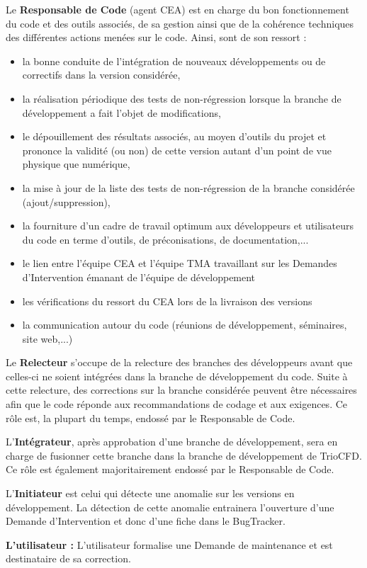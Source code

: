 Le \textbf{Responsable de Code} (agent CEA) est en charge du bon fonctionnement du code et des outils associ\'es, de sa gestion ainsi que de la coh\'erence techniques des diff\'erentes actions men\'ees sur le code. Ainsi, sont de son ressort :
\begin{itemize}[label=$\Rightarrow$, font=\LARGE]
  \item la bonne conduite de l'int\'egration de nouveaux d\'eveloppements ou de correctifs dans la version  consid\'er\'ee,
  \item la r\'ealisation p\'eriodique des tests de non-r\'egression lorsque la branche de d\'eveloppement a fait l'objet de modifications,
  \item le d\'epouillement des r\'esultats associ\'es, au moyen d'outils du projet et prononce la validit\'e (ou non) de cette version autant d'un point de vue physique que num\'erique,
  \item la mise \`a jour de la liste des tests de non-r\'egression de la branche consid\'er\'ee (ajout/suppression),
  \item la fourniture d'un cadre de travail optimum aux d\'eveloppeurs et utilisateurs du code en terme d'outils, de pr\'econisations, de documentation,...
  \item le lien entre l'\'equipe CEA et l'\'equipe TMA travaillant sur les Demandes d'Intervention \'emanant de l'\'equipe de d\'eveloppement
  \item les v\'erifications du ressort du CEA lors de la livraison des versions
  \item la communication autour du code (r\'eunions de d\'eveloppement, s\'eminaires, site web,...)
\end{itemize}\smallskip

Le \textbf{Relecteur} s'occupe de la relecture des branches des d\'eveloppeurs avant que celles-ci ne soient int\'egr\'ees dans la branche de d\'eveloppement du code. Suite \`a cette relecture, des corrections sur la branche consid\'er\'ee peuvent \^etre n\'ecessaires afin que le code r\'eponde aux recommandations de codage et aux exigences. Ce r\^ole est, la plupart du temps, endoss\'e par le Responsable de Code.\smallskip\newline

L'\textbf{Int\'egrateur}, après approbation d'une branche de d\'eveloppement, sera en charge de fusionner cette branche dans la branche de d\'eveloppement de TrioCFD. Ce r\^ole est \'egalement majoritairement endoss\'e par le Responsable de Code.\smallskip\newline

L'\textbf{Initiateur} est celui qui d\'etecte une anomalie sur les versions en d\'eveloppement. La d\'etection de cette anomalie entrainera l'ouverture d'une Demande d'Intervention et donc d'une fiche dans le BugTracker.\smallskip\newline

\textbf{L'utilisateur :} L'utilisateur formalise une Demande de maintenance et est destinataire de sa correction.

